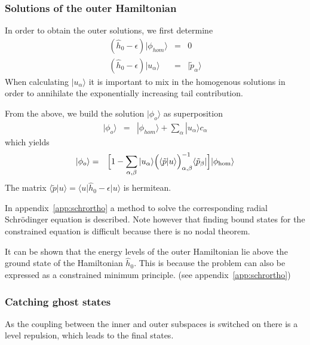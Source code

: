 \documentclass[11pt,a4paper]{report}
\begin{document}
\subsubsection{Solutions of the outer Hamiltonian}
In order to obtain the outer solutions, we first determine
\begin{eqnarray}
(\hat{h}_0-\epsilon)|\phi_{hom}\rangle&=&0
\nonumber\\
(\hat{h}_0-\epsilon)|u_\alpha\rangle&=&|\tilde{p}_\alpha\rangle
\end{eqnarray}
When calculating $|u_\alpha\rangle$ it is important to mix in the
homogenous solutions in order to annihilate the exponentially
increasing tail contribution.

From the above, we build the solution $|\phi_o\rangle$ as superposition
\begin{eqnarray}
|\phi_o\rangle&=&|\phi_{hom}\rangle+\sum_\alpha |u_\alpha\rangle c_\alpha
\end{eqnarray}
which yields
\begin{eqnarray}
|\phi_o\rangle&=&\Bigl[1-\sum_{\alpha,\beta}|u_\alpha\rangle
\Bigl(\langle\tilde{p}|u\rangle\Bigr)^{-1}_{\alpha,\beta}
\langle\tilde{p}_\beta|\Bigr]|\phi_{\hom}\rangle
\end{eqnarray}
The matrix
$\langle\tilde{p}|u\rangle
=\langle{u}|\hat{h}_0-\epsilon|u\rangle$ is hermitean.

In appendix~\ref{app:schrortho} a method to solve the corresponding
radial Schr\"odinger equation is described. Note however that finding
bound states for the constrained equation is difficult because there
is no nodal theorem.

It can be shown that the energy levels of the outer Hamiltonian lie
above the ground state of the Hamiltonian $\hat{h}_0$. This is because
the problem can also be expressed as a constrained minimum
principle. (see appendix~\ref{app:schrortho})



\subsubsection{Catching ghost states}
As the coupling between the inner and outer subspaces is switched on
there is a level repulsion, which leads to the final states.
\end{document}
